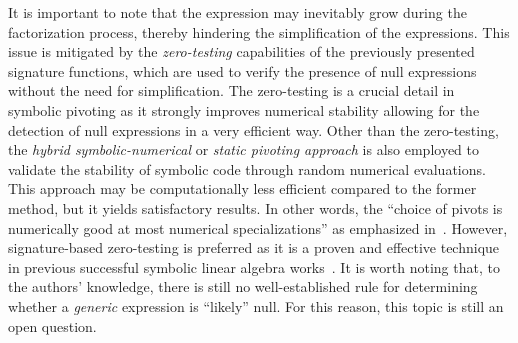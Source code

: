 It is important to note that the expression may inevitably grow during the factorization process, thereby hindering the simplification of the expressions. This issue is mitigated by the \emph{zero-testing} capabilities of the previously presented signature functions, which are used to verify the presence of null expressions without the need for simplification. The zero-testing is a crucial detail in symbolic pivoting as it strongly improves numerical stability allowing for the detection of null expressions in a very efficient way. Other than the zero-testing, the \emph{hybrid symbolic-numerical} or \emph{static pivoting approach} is also employed to validate the stability of symbolic code through random numerical evaluations. This approach may be computationally less efficient compared to the former method, but it yields satisfactory results. In other words, the ``choice of pivots is numerically good at most numerical specializations'' as emphasized in~\cite{giesbrecht2014symbolic}. However, signature-based zero-testing is preferred as it is a proven and effective technique in previous successful symbolic linear algebra works~\cite{carette2006linear, zhou2007symbolic}. It is worth noting that, to the authors' knowledge, there is still no well-established rule for determining whether a \emph{generic} expression is ``likely'' null. For this reason, this topic is still an open question.

